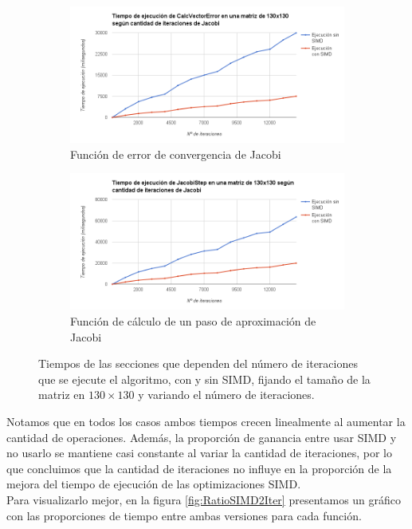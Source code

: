 \documentclass[a4paper]{article}
\begin{document}
\begin{figure}[!htbp]
\begin{subfigure}{.5\textwidth}
  \centering
	\includegraphics[width=\linewidth]{images/JacobiErrorIter.png}
  \caption{Función de error de convergencia de Jacobi}
  \label{fig:JacobiErrorIter}
\end{subfigure}%
\begin{subfigure}{.5\textwidth}
  \centering
	\includegraphics[width=\linewidth]{images/JacobiStepIter.png}
  \caption{Función de cálculo de un paso de aproximación de Jacobi}
  \label{fig:JacobiStepIter}
\end{subfigure}

\caption{Tiempos de las secciones que dependen del número de iteraciones que se ejecute el algoritmo, con y sin SIMD, fijando 
el tamaño de la matriz en $130 \times 130$ y variando el número de iteraciones.}
\label{fig:variandoIter}
\end{figure}

Notamos que en todos los casos ambos tiempos crecen linealmente al 
aumentar la cantidad de operaciones. Además, la proporción de ganancia 
entre usar SIMD y no usarlo se mantiene casi constante al variar la 
cantidad de iteraciones, por lo que concluimos que la cantidad de 
iteraciones no influye en la proporción de la mejora del tiempo de ejecución 
de las optimizaciones SIMD.\\
Para visualizarlo mejor, en la figura \ref{fig:RatioSIMD2Iter} 
presentamos un gráfico con las proporciones de tiempo entre ambas versiones para cada función.
\end{document}
